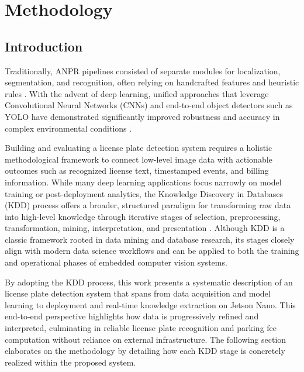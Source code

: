 %
%
%

\chapter{Methodology}


\section{Introduction}

Traditionally, ANPR pipelines consisted of separate modules for localization, segmentation, and recognition, often relying on handcrafted features and heuristic rules \cite{turn0search28}. With the advent of deep learning, unified approaches that leverage Convolutional Neural Networks (CNNs) and end-to-end object detectors such as YOLO have demonstrated significantly improved robustness and accuracy in complex environmental conditions \cite{turn0search5,turn0search0}.\newline 

Building and evaluating a license plate detection system requires a holistic methodological framework to connect low-level image data with actionable outcomes such as recognized license text, timestamped events, and billing information. While many deep learning applications focus narrowly on model training or post-deployment analytics, the Knowledge Discovery in Databases (KDD) process offers a broader, structured paradigm for transforming raw data into high-level knowledge through iterative stages of selection, preprocessing, transformation, mining, interpretation, and presentation \cite{fayyad1996knowledge}. Although KDD is a classic framework rooted in data mining and database research, its stages closely align with modern data science workflows and can be applied to both the training and operational phases of embedded computer vision systems.\newline

By adopting the KDD process, this work presents a systematic description of an license plate detection system that spans from data acquisition and model learning to deployment and real-time knowledge extraction on Jetson Nano. This end-to-end perspective highlights how data is progressively refined and interpreted, culminating in reliable license plate recognition and parking fee computation without reliance on external infrastructure. The following section elaborates on the methodology by detailing how each KDD stage is concretely realized within the proposed system.\newline

